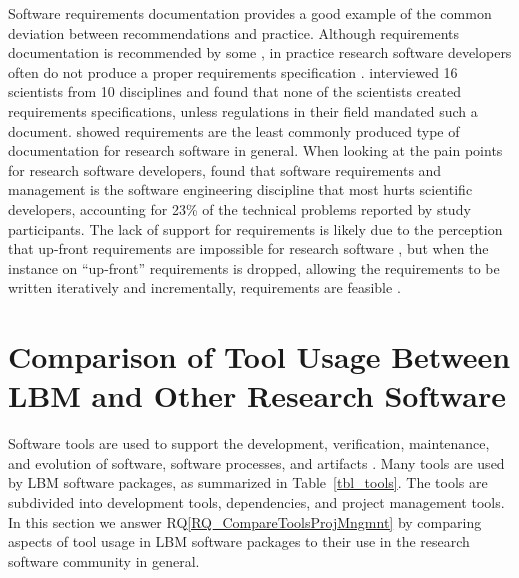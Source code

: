 \documentclass[final, 3p, times, authoryear]{elsarticle}
\newcommand{\rqref}[1]{RQ\ref{#1}}
\begin{document}
Software requirements documentation provides a good example of the common
deviation between recommendations and practice.  Although requirements
documentation is recommended by some \citep{TobiasEtAl2018, HerouxEtAl2008,
SmithAndKoothoor2016}, in practice research software developers often do not
produce a proper requirements specification \citep{HeatonAndCarver2015}.
\citet{SandersAndKelly2008} interviewed 16 scientists from 10 disciplines and
found that none of the scientists created requirements specifications, unless
regulations in their field mandated such a document. \citet{Nguyen-HoanEtAl2010}
showed requirements are the least commonly produced type of documentation for
research software in general. When looking at the pain points for research
software developers, \citet{WieseEtAl2019} found that software requirements and
management is the software engineering discipline that most hurts scientific
developers, accounting for 23\% of the technical problems reported by study
participants.  The lack of support for requirements is likely due to the
perception that up-front requirements are impossible for research software
\citep{CarverEtAl2007,SegalAndMorris2008}, but when the instance on ``up-front''
requirements is dropped, allowing the requirements to be written iteratively and
incrementally, requirements are feasible \citep{Smith2016}.

\section{Comparison of Tool Usage Between LBM and Other Research Software}
\label{Sec_CompareTools}

Software tools are used to support the development, verification, maintenance,
and evolution of software, software processes, and artifacts \citep[p.\
501]{GhezziEtAl2003}. Many tools are used by LBM software packages, as
summarized in Table~\ref{tbl_tools}.  The tools are subdivided into development
tools, dependencies, and project management tools.  In this section we answer
\rqref{RQ_CompareToolsProjMngmnt} by comparing aspects of tool usage in LBM
software packages to their use in the research software community in
general.
\end{document}
